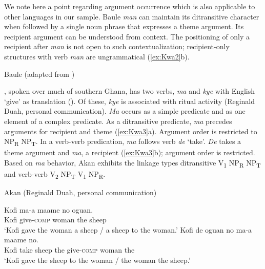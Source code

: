 \documentclass[output=paper,colorlinks,citecolor=brown]{langscibook}
\begin{document}
We note here a point regarding argument occurrence which is also applicable to other languages in our sample. Baule \textit{man} can maintain its ditransitive character when followed by a single noun phrase that expresses a theme argument. Its recipient argument can be understood from context. The positioning of only a recipient after \textit{man} is not open to such contextualization; recipient-only structures with verb \textit{man} are ungrammatical (\ref{ex:Kwa2}b).

\ea \label{ex:Kwa2} Baule (adapted from \citealt[18]{CreisselsKouadio2010})
\begin{xlist}
\end{xlist}
\z

, spoken over much of southern Ghana, has two verbs, \textit{ma} and \textit{kye} with English ‘give’ as translation (\cite[23]{Osam2004}). Of these, \textit{kye} is associated with ritual activity (Reginald Duah, personal communication). \textit{Ma} occurs as a simple predicate and as one element of a complex predicate. As a ditransitive predicate, \textit{ma} precedes arguments for recipient and theme (\ref{ex:Kwa3}a). Argument order  is restricted to NP\textsubscript{R} NP\textsubscript{T}. In a verb-verb predication, \textit{ma} follows verb \textit{de} ‘take’. \textit{De} takes a theme argument and \textit{ma}, a recipient (\ref{ex:Kwa3}b); argument order is restricted. Based on \textit{ma} behavior, Akan exhibits the linkage types ditransitive V\textsubscript{1} NP\textsubscript{R} NP\textsubscript{T} and verb-verb V\textsubscript{2} NP\textsubscript{T} V\textsubscript{1} NP\textsubscript{R}.
\newpage

\ea\label{ex:Kwa3}Akan (Reginald Duah, personal communication)
\begin{xlist}
\ex
\gll Kofi		ma-a					maame		no			oguan.\\
					Kofi	give-\textsc{comp}	woman		the		sheep\\
\glt				‘Kofi gave the woman a sheep / a sheep to the woman.’
\ex
\gll 	Kofi		de		oguan	no		ma-a						maame			no.\\
					Kofi	take sheep		the	give-\textsc{comp}		woman			the\\
\glt					‘Kofi gave the sheep to the woman / the woman the sheep.’
\end{xlist}
\z
\end{document}
